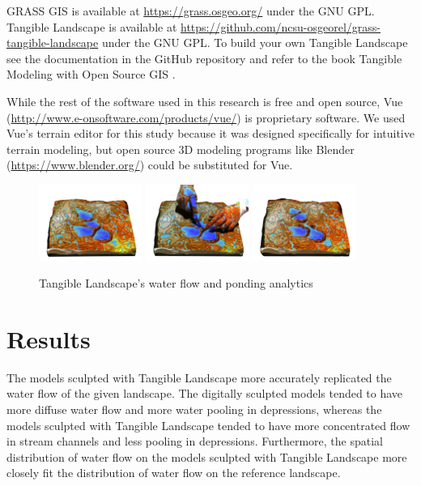 \documentclass{isprs}
\begin{document}
GRASS GIS is available at
\url{https://grass.osgeo.org/} 
under the GNU GPL. 
%
Tangible Landscape is available at
\url{https://github.com/ncsu-osgeorel/grass-tangible-landscape}
under the GNU GPL. 
%
To build your own Tangible Landscape
see the documentation in the GitHub repository 
and refer to the book Tangible Modeling with Open Source GIS \cite{Petrasova2015}.

While the rest of the software used in this research is free and open source, 
Vue (\url{http://www.e-onsoftware.com/products/vue/}) is proprietary software. 
We used Vue's terrain editor for this study because it was designed specifically for intuitive terrain modeling, but 
open source 3D modeling programs like Blender (\url{https://www.blender.org/}) could be substituted for Vue. 
%

\begin{figure}[h!]
\begin{center}
		\includegraphics[width=0.3\textwidth]{figures/tl_fill_dir_1.png}
		\includegraphics[width=0.3\textwidth]{figures/tl_fill_dir_2.png}
		\includegraphics[width=0.3\textwidth]{figures/tl_fill_dir_3.png}
	\caption{Tangible Landscape's water flow and ponding analytics}
	\label{fig:tl_ponding}
\end{center}
\end{figure}

\section{Results}\label{sec:results}
%
The models sculpted with Tangible Landscape more accurately replicated the water flow of the given landscape. 
%
The digitally sculpted models tended to have 
more diffuse water flow
and more water pooling in depressions, whereas 
%
the models sculpted with Tangible Landscape tended to have 
more concentrated flow in stream channels
and less pooling in depressions.
%
Furthermore, 
the spatial distribution of water flow on the models sculpted with Tangible Landscape 
more closely fit the distribution of water flow on the reference landscape. 
\end{document}
